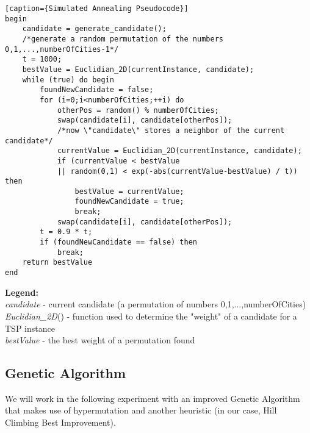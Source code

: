 \documentclass[a4paper]{article}
\begin{document}
\begin{lstlisting}[frame=single][caption={Simulated Annealing Pseudocode}]
begin
	candidate = generate_candidate(); 
	/*generate a random permutation of the numbers 0,1,...,numberOfCities-1*/
	t = 1000;
	bestValue = Euclidian_2D(currentInstance, candidate);
	while (true) do begin
		foundNewCandidate = false;
		for (i=0;i<numberOfCities;++i) do
			otherPos = random() % numberOfCities; 
			swap(candidate[i], candidate[otherPos]);
			/*now \"candidate\" stores a neighbor of the current candidate*/
			currentValue = Euclidian_2D(currentInstance, candidate);
			if (currentValue < bestValue 
			|| random(0,1) < exp(-abs(currentValue-bestValue) / t)) then
				bestValue = currentValue;
				foundNewCandidate = true;
				break;
			swap(candidate[i], candidate[otherPos]);
		t = 0.9 * t;	
		if (foundNewCandidate == false) then
			break;
	return bestValue
end
\end{lstlisting}
\justify
\textbf{Legend:}\\
{\itshape candidate} - current candidate (a permutation of numbers 0,1,...,numberOfCities)\\
{\itshape Euclidian\_2D}() - function used to determine the "weight" of a candidate for a TSP instance\\
{\itshape bestValue} - the best weight of a permutation found

\subsection{Genetic Algorithm}

We will work in the following experiment with an improved Genetic Algorithm that makes use of hypermutation and another heuristic (in our case, Hill Climbing Best Improvement).
\end{document}
